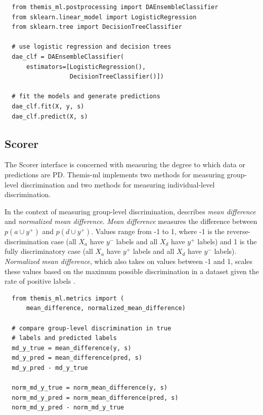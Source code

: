 \documentclass{interact}
\begin{document}
\begin{verbatim}
  from themis_ml.postprocessing import DAEnsembleClassifier
  from sklearn.linear_model import LogisticRegression
  from sklearn.tree import DecisionTreeClassifier

  # use logistic regression and decision trees
  dae_clf = DAEnsembleClassifier(
      estimators=[LogisticRegression(),
                  DecisionTreeClassifier()])

  # fit the models and generate predictions
  dae_clf.fit(X, y, s)
  dae_clf.predict(X, s)
\end{verbatim}

\subsection{Scorer}

The Scorer interface is concerned with measuring the degree to which data or
predictions are PD. Themis-ml implements two methods for measuring group-level
discrimination and two methods for measuring individual-level discrimination.

In the context of measuring group-level discrimination,
\cite{zliobaite2015survey} describes \emph{mean difference} and \emph{normalized
mean difference}. \emph{Mean difference} measures the difference between \(p(a
\cup y^{+})\) and \(p(d \cup y^{+})\). Values range from -1 to 1, where -1 is
the reverse-discrimination case (all \(X_a\) have \(y^{-}\) labels and all
\(X_d\) have \(y^{+}\) labels) and 1 is the fully discriminatory case
(all \(X_a\) have \(y^{+}\) labels and all \(X_d\) have \(y^{-}\) labels).
\emph{Normalized mean difference}, which also takes on values between -1 and 1,
scales these values based on the maximum possible discrimination in a dataset
given the rate of positive labels \cite{zliobaite2015survey}.

\begin{verbatim}
  from themis_ml.metrics import (
      mean_difference, normalized_mean_difference)

  # compare group-level discrimination in true
  # labels and predicted labels
  md_y_true = mean_difference(y, s)
  md_y_pred = mean_difference(pred, s)
  md_y_pred - md_y_true

  norm_md_y_true = norm_mean_difference(y, s)
  norm_md_y_pred = norm_mean_difference(pred, s)
  norm_md_y_pred - norm_md_y_true
\end{verbatim}
\end{document}
